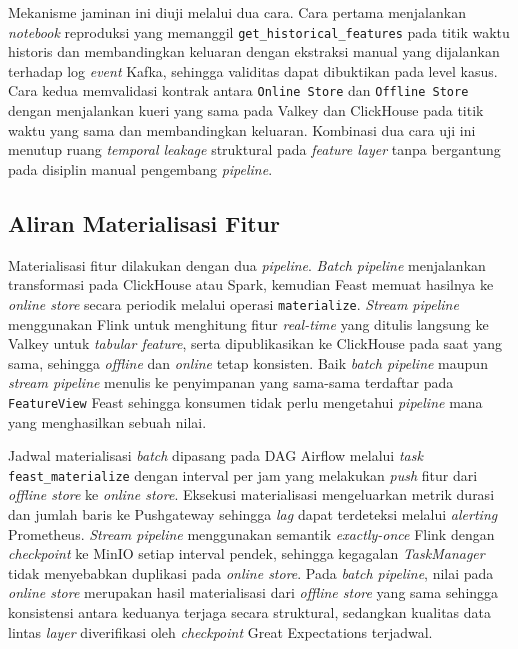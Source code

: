Mekanisme jaminan ini diuji melalui dua cara. Cara pertama menjalankan \textit{notebook} reproduksi yang memanggil \texttt{get\_historical\_features} pada titik waktu historis dan membandingkan keluaran dengan ekstraksi manual yang dijalankan terhadap log \textit{event} Kafka, sehingga validitas dapat dibuktikan pada level kasus. Cara kedua memvalidasi kontrak antara \texttt{Online Store} dan \texttt{Offline Store} dengan menjalankan kueri yang sama pada Valkey dan ClickHouse pada titik waktu yang sama dan membandingkan keluaran. Kombinasi dua cara uji ini menutup ruang \textit{temporal leakage} struktural pada \textit{feature layer} tanpa bergantung pada disiplin manual pengembang \textit{pipeline}.

\subsection{Aliran Materialisasi Fitur}
\label{subsec:materialisasi-fitur}

Materialisasi fitur dilakukan dengan dua \textit{pipeline}. \textit{Batch pipeline} menjalankan transformasi pada ClickHouse atau Spark, kemudian Feast memuat hasilnya ke \textit{online store} secara periodik melalui operasi \texttt{materialize}. \textit{Stream pipeline} menggunakan Flink untuk menghitung fitur \textit{real-time} yang ditulis langsung ke Valkey untuk \textit{tabular feature}, serta dipublikasikan ke ClickHouse pada saat yang sama, sehingga \textit{offline} dan \textit{online} tetap konsisten. Baik \textit{batch pipeline} maupun \textit{stream pipeline} menulis ke penyimpanan yang sama-sama terdaftar pada \texttt{FeatureView} Feast sehingga konsumen tidak perlu mengetahui \textit{pipeline} mana yang menghasilkan sebuah nilai.

Jadwal materialisasi \textit{batch} dipasang pada DAG Airflow melalui \textit{task} \texttt{feast\_materialize} dengan interval per jam yang melakukan \textit{push} fitur dari \textit{offline store} ke \textit{online store}. Eksekusi materialisasi mengeluarkan metrik durasi dan jumlah baris ke Pushgateway sehingga \textit{lag} dapat terdeteksi melalui \textit{alerting} Prometheus. \textit{Stream pipeline} menggunakan semantik \textit{exactly-once} Flink dengan \textit{checkpoint} ke MinIO setiap interval pendek, sehingga kegagalan \textit{TaskManager} tidak menyebabkan duplikasi pada \textit{online store}. Pada \textit{batch pipeline}, nilai pada \textit{online store} merupakan hasil materialisasi dari \textit{offline store} yang sama sehingga konsistensi antara keduanya terjaga secara struktural, sedangkan kualitas data lintas \textit{layer} diverifikasi oleh \textit{checkpoint} Great Expectations terjadwal.

